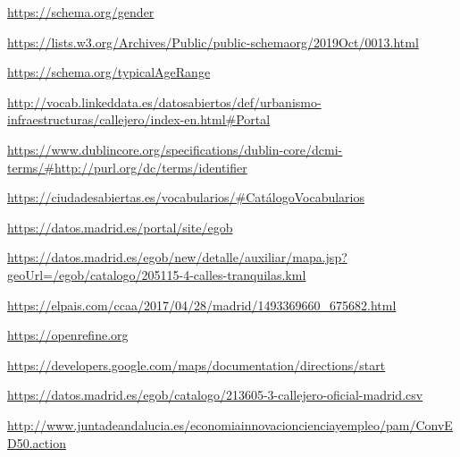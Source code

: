 \begin{thebibliography}{99}
\url{https://schema.org/gender}

\url{https://lists.w3.org/Archives/Public/public-schemaorg/2019Oct/0013.html}

\url{https://schema.org/typicalAgeRange}


\url{http://vocab.linkeddata.es/datosabiertos/def/urbanismo-infraestructuras/callejero/index-en.html#Portal}


\url{https://www.dublincore.org/specifications/dublin-core/dcmi-terms/#http://purl.org/dc/terms/identifier}


\url{https://ciudadesabiertas.es/vocabularios/#CatálogoVocabularios}


\url{https://datos.madrid.es/portal/site/egob}

\url{https://datos.madrid.es/egob/new/detalle/auxiliar/mapa.jsp?geoUrl=/egob/catalogo/205115-4-calles-tranquilas.kml}

\url{https://elpais.com/ccaa/2017/04/28/madrid/1493369660_675682.html}


\url{https://openrefine.org}

\url{https://developers.google.com/maps/documentation/directions/start}

\url{https://datos.madrid.es/egob/catalogo/213605-3-callejero-oficial-madrid.csv}

\url{http://www.juntadeandalucia.es/economiainnovacioncienciayempleo/pam/ConvED50.action}


\end{thebibliography}
